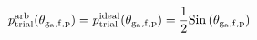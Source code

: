\documentclass[12pt]{article}
\begin{document}
\begin{displaymath}
p_{\rm trial}^{\rm arb}(\theta_{\rm g_a,f,p}) = 
p_{\rm trial}^{\rm ideal}(\theta_{\rm g_a,f,p}) = {{1}\over{2}} {\rm Sin}\left(\theta_{\rm g_a,f,p}\right)
\end{displaymath}
\end{document}
